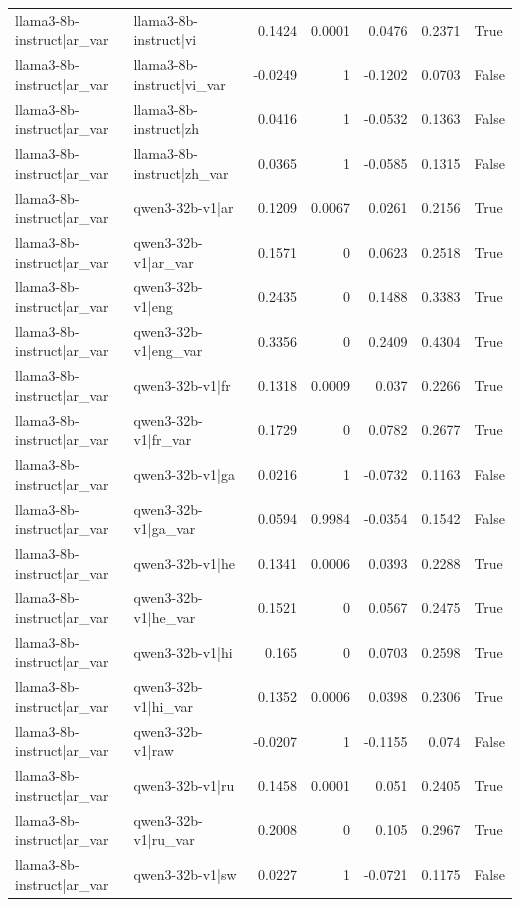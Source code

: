 \begin{table}
\begin{tabular}{l l r r r r l}
llama3-8b-instruct|ar_var & llama3-8b-instruct|vi & 0.1424 & 0.0001 & 0.0476 & 0.2371 & True \\
llama3-8b-instruct|ar_var & llama3-8b-instruct|vi_var & -0.0249 & 1 & -0.1202 & 0.0703 & False \\
llama3-8b-instruct|ar_var & llama3-8b-instruct|zh & 0.0416 & 1 & -0.0532 & 0.1363 & False \\
llama3-8b-instruct|ar_var & llama3-8b-instruct|zh_var & 0.0365 & 1 & -0.0585 & 0.1315 & False \\
llama3-8b-instruct|ar_var & qwen3-32b-v1|ar & 0.1209 & 0.0067 & 0.0261 & 0.2156 & True \\
llama3-8b-instruct|ar_var & qwen3-32b-v1|ar_var & 0.1571 & 0 & 0.0623 & 0.2518 & True \\
llama3-8b-instruct|ar_var & qwen3-32b-v1|eng & 0.2435 & 0 & 0.1488 & 0.3383 & True \\
llama3-8b-instruct|ar_var & qwen3-32b-v1|eng_var & 0.3356 & 0 & 0.2409 & 0.4304 & True \\
llama3-8b-instruct|ar_var & qwen3-32b-v1|fr & 0.1318 & 0.0009 & 0.037 & 0.2266 & True \\
llama3-8b-instruct|ar_var & qwen3-32b-v1|fr_var & 0.1729 & 0 & 0.0782 & 0.2677 & True \\
llama3-8b-instruct|ar_var & qwen3-32b-v1|ga & 0.0216 & 1 & -0.0732 & 0.1163 & False \\
llama3-8b-instruct|ar_var & qwen3-32b-v1|ga_var & 0.0594 & 0.9984 & -0.0354 & 0.1542 & False \\
llama3-8b-instruct|ar_var & qwen3-32b-v1|he & 0.1341 & 0.0006 & 0.0393 & 0.2288 & True \\
llama3-8b-instruct|ar_var & qwen3-32b-v1|he_var & 0.1521 & 0 & 0.0567 & 0.2475 & True \\
llama3-8b-instruct|ar_var & qwen3-32b-v1|hi & 0.165 & 0 & 0.0703 & 0.2598 & True \\
llama3-8b-instruct|ar_var & qwen3-32b-v1|hi_var & 0.1352 & 0.0006 & 0.0398 & 0.2306 & True \\
llama3-8b-instruct|ar_var & qwen3-32b-v1|raw & -0.0207 & 1 & -0.1155 & 0.074 & False \\
llama3-8b-instruct|ar_var & qwen3-32b-v1|ru & 0.1458 & 0.0001 & 0.051 & 0.2405 & True \\
llama3-8b-instruct|ar_var & qwen3-32b-v1|ru_var & 0.2008 & 0 & 0.105 & 0.2967 & True \\
llama3-8b-instruct|ar_var & qwen3-32b-v1|sw & 0.0227 & 1 & -0.0721 & 0.1175 & False \\

\end{tabular}
\end{table}
